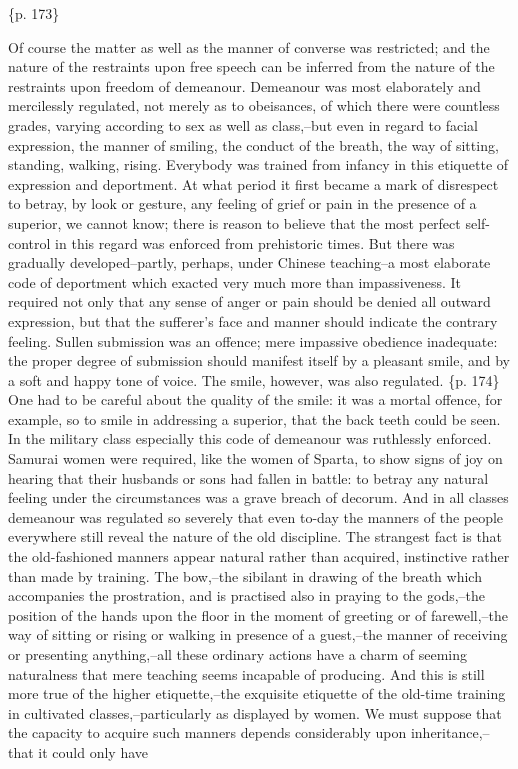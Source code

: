 \{p. 173\}

Of course the matter as well as the manner of converse was restricted; and the nature of the restraints upon free speech can be inferred from the nature of the restraints upon freedom of demeanour. Demeanour was most elaborately and mercilessly regulated, not merely as to obeisances, of which there were countless grades, varying according to sex as well as class,--but even in regard to facial expression, the manner of smiling, the conduct of the breath, the way of sitting, standing, walking, rising. Everybody was trained from infancy in this etiquette of expression and deportment. At what period it first became a mark of disrespect to betray, by look or gesture, any feeling of grief or pain in the presence of a superior, we cannot know; there is reason to believe that the most perfect self-control in this regard was enforced from prehistoric times. But there was gradually developed--partly, perhaps, under Chinese teaching--a most elaborate code of deportment which exacted very much more than impassiveness. It required not only that any sense of anger or pain should be denied all outward expression, but that the sufferer's face and manner should indicate the contrary feeling. Sullen submission was an offence; mere impassive obedience inadequate: the proper degree of submission should manifest itself by a pleasant smile, and by a soft and happy tone of voice. The smile, however, was also regulated. \{p. 174\} One had to be careful about the quality of the smile: it was a mortal offence, for example, so to smile in addressing a superior, that the back teeth could be seen. In the military class especially this code of demeanour was ruthlessly enforced. Samurai women were required, like the women of Sparta, to show signs of joy on hearing that their husbands or sons had fallen in battle: to betray any natural feeling under the circumstances was a grave breach of decorum. And in all classes demeanour was regulated so severely that even to-day the manners of the people everywhere still reveal the nature of the old discipline. The strangest fact is that the old-fashioned manners appear natural rather than acquired, instinctive rather than made by training. The bow,--the sibilant in drawing of the breath which accompanies the prostration, and is practised also in praying to the gods,--the position of the hands upon the floor in the moment of greeting or of farewell,--the way of sitting or rising or walking in presence of a guest,--the manner of receiving or presenting anything,--all these ordinary actions have a charm of seeming naturalness that mere teaching seems incapable of producing. And this is still more true of the higher etiquette,--the exquisite etiquette of the old-time training in cultivated classes,--particularly as displayed by women. We must suppose that the capacity to acquire such manners depends considerably upon inheritance,--that it could only have


